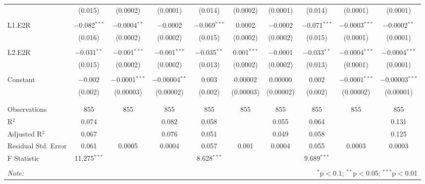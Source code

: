 \begin{table}[!htbp]
\begin{tabular}{@{\extracolsep{5pt}}lccccccccc}
  & (0.015) & (0.0002) & (0.0001) & (0.014) & (0.0002) & (0.0001) & (0.014) & (0.0001) & (0.0001) \\ 
  & & & & & & & & & \\ 
 L1.E2R & $-$0.082$^{***}$ & $-$0.0004$^{**}$ & $-$0.0002 & $-$0.069$^{***}$ & 0.0002 & $-$0.0002 & $-$0.071$^{***}$ & $-$0.0003$^{***}$ & $-$0.0002$^{**}$ \\ 
  & (0.016) & (0.0002) & (0.0002) & (0.015) & (0.0002) & (0.0002) & (0.015) & (0.0001) & (0.0001) \\ 
  & & & & & & & & & \\ 
 L2.E2R & $-$0.031$^{**}$ & $-$0.001$^{***}$ & $-$0.001$^{***}$ & $-$0.035$^{**}$ & 0.001$^{***}$ & $-$0.0001 & $-$0.033$^{**}$ & $-$0.0004$^{***}$ & $-$0.0004$^{***}$ \\ 
  & (0.015) & (0.0002) & (0.0002) & (0.013) & (0.0002) & (0.0002) & (0.013) & (0.0001) & (0.0001) \\ 
  & & & & & & & & & \\ 
 Constant & $-$0.002 & $-$0.0001$^{***}$ & $-$0.00004$^{**}$ & 0.003 & 0.00002 & 0.00000 & 0.002 & $-$0.0001$^{***}$ & $-$0.00003$^{***}$ \\ 
  & (0.002) & (0.00003) & (0.00002) & (0.002) & (0.00003) & (0.00002) & (0.002) & (0.00002) & (0.00001) \\ 
  & & & & & & & & & \\ 
\hline \\[-1.8ex] 
Observations & 855 & 855 & 855 & 855 & 855 & 855 & 855 & 855 & 855 \\ 
R$^{2}$ & 0.074 &  & 0.082 & 0.058 &  & 0.055 & 0.064 &  & 0.131 \\ 
Adjusted R$^{2}$ & 0.067 &  & 0.076 & 0.051 &  & 0.049 & 0.058 &  & 0.125 \\ 
Residual Std. Error & 0.061 & 0.0005 & 0.0004 & 0.057 & 0.001 & 0.0004 & 0.055 & 0.0003 & 0.0003 \\ 
F Statistic & 11.275$^{***}$ &  &  & 8.628$^{***}$ &  &  & 9.689$^{***}$ &  &  \\ 
\hline 
\hline \\[-1.8ex] 
\textit{Note:}  & \multicolumn{9}{r}{$^{*}$p$<$0.1; $^{**}$p$<$0.05; $^{***}$p$<$0.01} \\ 
\end{tabular} 
\end{table} 
